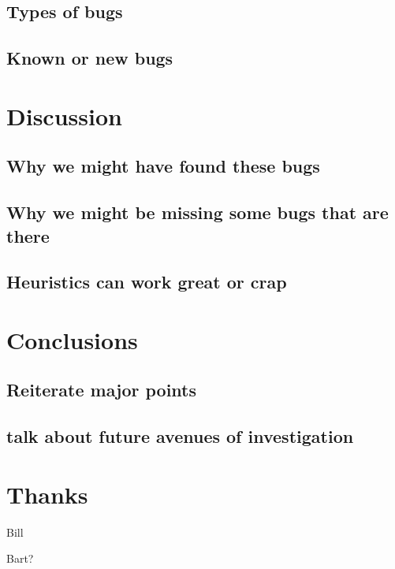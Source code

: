 \documentclass[10pt,]{article} %
\begin{document}
\subsection{Types of bugs}

\subsection{Known or new bugs}


\section{Discussion}


\subsection{Why we might have found these bugs}

\subsection{Why we might be missing some bugs that are there}

\subsection{Heuristics can work great or crap}


\section{Conclusions}


\subsection{Reiterate major points}

\subsection{talk about future avenues of investigation}


\section{Thanks}


	Bill

	Bart?
\end{document}
